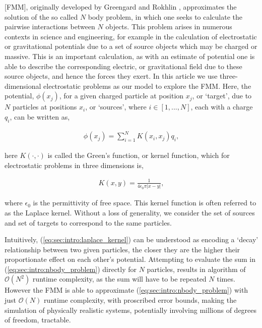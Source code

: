 \documentclass{IEEEcsmag}
\begin{document}
 [FMM], originally developed by Greengard and Rokhlin \cite{Greengard1987}, approximates the solution of the so called $N$ body problem, in which one seeks to calculate the pairwise interactions between $N$ objects. This problem arises in numerous contexts in science and engineering, for example in the calculation of electrostatic or gravitational potentials due to a set of source objects which may be charged or massive. This is an important calculation, as with an estimate of potential one is able to describe the corresponding electric, or gravitational field due to these source objects, and hence the forces they exert. In this article we use three-dimensional electrostatic problems as our model to explore the FMM. Here, the potential, $\phi(x_j)$, for a given charged particle at position $x_j$, or `target', due to $N$ particles at positions $x_i$, or `sources', where $i \in [1, ..., N]$, each with a charge $q_i$, can be written as,

\begin{eqnarray}
	\phi(x_j) = \sum_{i=1}^{N} K(x_i, x_j) q_i,
\label{eq:sec:intro:nbody_problem}
\end{eqnarray}


here $K(\cdot, \cdot)$ is called the Green's function, or kernel function, which for electrostatic problems in three dimensions is,

\begin{eqnarray}
	K(x, y) = \frac{1}{4\epsilon_0\pi|x-y|},
\label{eq:sec:intro:laplace_kernel}
\end{eqnarray}

where $\epsilon_0$ is the permittivity of free space. This kernel function is often referred to as the Laplace kernel. Without a loss of generality, we consider the set of sources and set of targets to correspond to the same particles.

Intuitively, (\ref{eq:sec:intro:laplace_kernel}) can be understood as encoding a `decay' relationship between two given particles, the closer they are the higher their proportionate effect on each other's potential. Attempting to evaluate the sum in (\ref{eq:sec:intro:nbody_problem}) directly for $N$ particles, results in algorithm of $\mathcal{O}(N^2)$ runtime complexity, as the sum will have to be repeated $N$ times. However the FMM is able to approximate (\ref{eq:sec:intro:nbody_problem}) with just $\mathcal{O}(N)$ runtime complexity, with proscribed error bounds, making the simulation of physically realistic systems, potentially involving millions of degrees of freedom, tractable.
\end{document}
